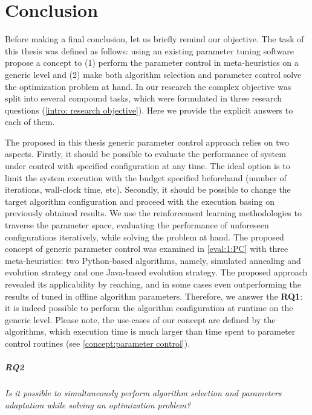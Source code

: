 \chapter{Conclusion}\label{conclusion}
Before making a final conclusion, let us briefly remind our objective.
The task of this thesis was defined as follows: using an existing parameter tuning software propose a concept to (1) perform the parameter control in meta-heuristics on a generic level and (2) make both algorithm selection and parameter control solve the optimization problem at hand. In our research the complex objective was split into several compound tasks, which were formulated in three research questions (\cref{intro: research objective}). Here we provide the explicit answers to each of them.

The proposed in this thesis generic parameter control approach relies on two aspects. Firstly, it should be possible to evaluate the performance of system under control with specified configuration at any time. The ideal option is to limit the system execution with the budget specified beforehand (number of iterations, wall-clock time, etc). Secondly, it should be possible to change the target algorithm configuration and proceed with the execution basing on previously obtained results. We use the reinforcement learning methodologies to traverse the parameter space, evaluating the performance of unforeseen configurations iteratively, while solving the problem at hand. The proposed concept of generic parameter control was examined in \cref{eval:1:PC} with three meta-heuristics: two Python-based algorithms, namely, simulated annealing and evolution strategy and one Java-based evolution strategy. The proposed approach revealed its applicability by reaching, and in some cases even outperforming the results of tuned in offline algorithm parameters. Therefore, we answer the \textbf{RQ1}: it is indeed possible to perform the algorithm configuration at runtime on the generic level. Please note, the use-cases of our concept are defined by the algorithms, which execution time is much larger than time spent to parameter control routines (see \cref{concept:parameter control}).

\paragraph{RQ2} \emph{Is it possible to simultaneously perform algorithm selection and parameters adaptation while solving an optimization problem?}

